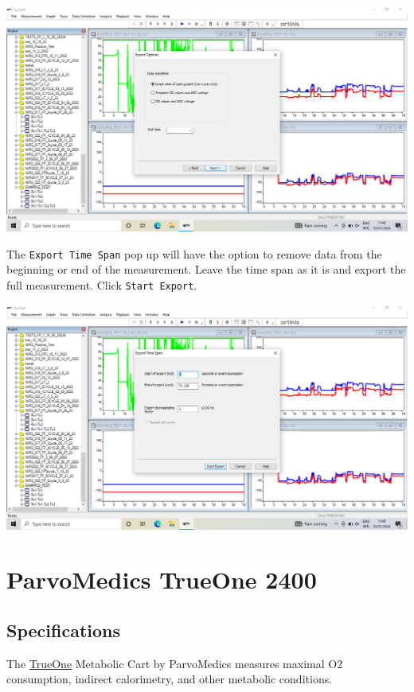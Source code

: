 \documentclass[
]{book}
\begin{document}
\includegraphics[width=1\linewidth]{images/exportmeasurement/7_chooseexportopengraphs}

The \texttt{Export\ Time\ Span} pop up will have the option to remove data from the beginning or end of the measurement. Leave the time span as it is and export the full measurement. Click \texttt{Start\ Export}.

\includegraphics[width=1\linewidth]{images/exportmeasurement/8_exportwholemeasurement}

\hypertarget{Appendix-Instruments-Parvo}{%
\section{ParvoMedics TrueOne 2400}\label{Appendix-Instruments-Parvo}}

\hypertarget{Appendix-Instruments-Parvo-Specs}{%
\subsection{Specifications}\label{Appendix-Instruments-Parvo-Specs}}

The \href{http://www.parvo.com/}{TrueOne} Metabolic Cart by ParvoMedics measures maximal O2 consumption, indirect calorimetry, and other metabolic conditions.
\end{document}

